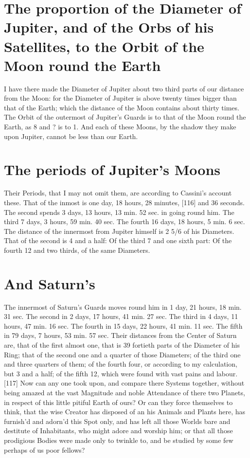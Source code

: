 \documentclass[letterpaper]{book}
\begin{document}
\section{The proportion of the Diameter of Jupiter, and of
the Orbs of his Satellites, to the Orbit of the Moon
round the Earth}

I have there made the Diameter of Jupiter about two third parts of our
distance from the Moon: for the Diameter of Jupiter is above twenty times
bigger than that of the Earth; which the distance of the Moon contains
about thirty times. The Orbit of the outermost of Jupiter's Guards is to
that of the Moon round the Earth, as 8 and ? is to 1. And each of these
Moons, by the shadow they make upon Jupiter, cannot be less than our
Earth.


\section{The periods of Jupiter's Moons}

Their Periods, that I may not omit them, are according to Cassini's account
these. That of the inmost is one day, 18 hours, 28 minutes, [116] and 36
seconds. The second spends 3 days, 13 hours, 13 min. 52 sec. in going
round him. The third 7 days, 3 hours, 59 min. 40 sec. The fourth 16 days,
18 hours, 5 min. 6 sec. The distance of the innermost from Jupiter himself
is 2 5/6 of his Diameters. That of the second is 4 and a half: Of the third 7
and one sixth part: Of the fourth 12 and two thirds, of the same Diameters.


\section{And Saturn's}

The innermost of Saturn's Guards moves round him in 1 day, 21 hours, 18 min.
31 sec. The second in 2 days, 17 hours, 41 min. 27 sec. The third in 4 days,
11 hours, 47 min. 16 sec. The fourth in 15 days, 22 hours, 41 min. 11 sec.
The fifth in 79 days, 7 hours, 53 min. 57 sec. Their distances from the
Center of Saturn are, that of the first almost one, that is 39 fortieth
parts of the Diameter of his Ring; that of the second one and a quarter of
those Diameters; of the third one and three quarters of them; of the fourth
four, or according to my calculation, but 3 and a half; of the fifth 12,
which were found with vast pains and labour.  [117] Now can any one took
upon, and compare there Systems together, without being amazed at the vast
Magnitude and noble Attendance of there two Planets, in respect of this
little pitiful Earth of ours? Or can they force themselves to think, that
the wise Creator has disposed of an his Animals and Plants here, has
furnish'd and adorn'd this Spot only, and has left all those Worlds bare and
destitute of Inhabitants, who might adore and worship him; or that all those
prodigious Bodies were made only to twinkle to, and be studied by some few
perhaps of us poor fellows?
\end{document}
